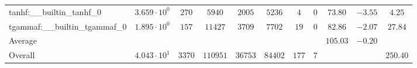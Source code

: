 \begin{tabular}{|l|c|c|c|c|c|c|c|c|c|c|}
tanhf:\_\_builtin\_tanhf\_0               & $ 3.659 \cdot 10^{0}  $ & $ 270    $ & $ 5940   $ & $ 2005  $ & $ 5236  $ & $ 4   $ & $ 0 $ & $ 73.80       $ & $ -3.55   $ & $ 4.25    $ \\
tgammaf:\_\_builtin\_tgammaf\_0           & $ 1.895 \cdot 10^{0}  $ & $ 157    $ & $ 11427  $ & $ 3709  $ & $ 7702  $ & $ 19  $ & $ 0 $ & $ 82.86       $ & $ -2.07   $ & $ 27.84   $ \\
\hline
Average                                   & $                     $ & $        $ & $        $ & $       $ & $       $ & $     $ & $   $ & $ 105.03      $ & $ -0.20   $ & $         $ \\
\hline
Overall                                   & $ 4.043 \cdot 10^{1}  $ & $ 3370   $ & $ 110951 $ & $ 36753 $ & $ 84402 $ & $ 177 $ & $ 7 $ & $             $ & $         $ & $ 250.40  $ \\
\hline
\end{tabular}
